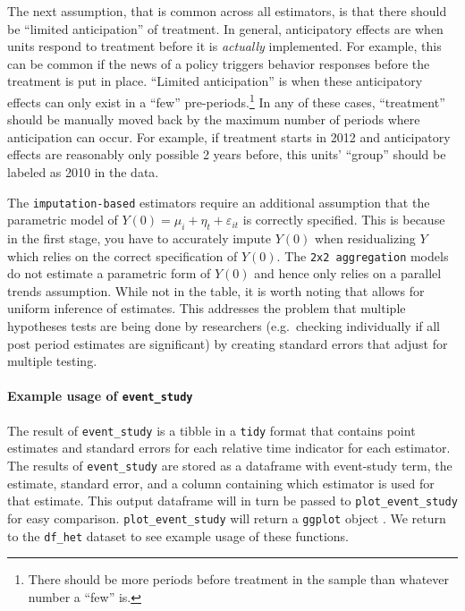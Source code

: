 The next assumption, that is common across all estimators, is that there
should be ``limited anticipation'' of treatment. In general,
anticipatory effects are when units respond to treatment before it is
\emph{actually} implemented. For example, this can be common if the news
of a policy triggers behavior responses before the treatment is put in
place. ``Limited anticipation'' is when these anticipatory effects can
only exist in a ``few'' pre-periods.\footnote{There should be more
  periods before treatment in the sample than whatever number a ``few''
  is.} In any of these cases, ``treatment'' should be manually moved
back by the maximum number of periods where anticipation can occur. For
example, if treatment starts in 2012 and anticipatory effects are
reasonably only possible 2 years before, this units' ``group'' should be
labeled as 2010 in the data.

The \texttt{imputation-based} estimators require an additional
assumption that the parametric model of
\(Y(0) = \mu_i + \eta_t + \varepsilon_{it}\) is correctly specified.
This is because in the first stage, you have to accurately impute
\(Y(0)\) when residualizing \(Y\) which relies on the correct
specification of \(Y(0)\). The \texttt{2x2\ aggregation} models do not
estimate a parametric form of \(Y(0)\) and hence only relies on a
parallel trends assumption. While not in the table, it is worth noting
that  allows for uniform inference of estimates. This
addresses the problem that multiple hypotheses tests are being done by
researchers (e.g.~checking individually if all post period estimates are
significant) by creating standard errors that adjust for multiple
testing.

\hypertarget{example-usage-of-event_study}{%
\paragraph{\texorpdfstring{Example usage of
\texttt{event\_study}}{Example usage of event\_study}}\label{example-usage-of-event_study}}

The result of \texttt{event\_study} is a tibble in a \texttt{tidy}
format \citep{broom} that contains point estimates and standard errors
for each relative time indicator for each estimator. The results of
\texttt{event\_study} are stored as a dataframe with event-study term,
the estimate, standard error, and a column containing which estimator is
used for that estimate. This output dataframe will in turn be passed to
\texttt{plot\_event\_study} for easy comparison.
\texttt{plot\_event\_study} will return a \texttt{ggplot} object
\citep{ggplot2}. We return to the \texttt{df\_het} dataset to see
example usage of these functions.

